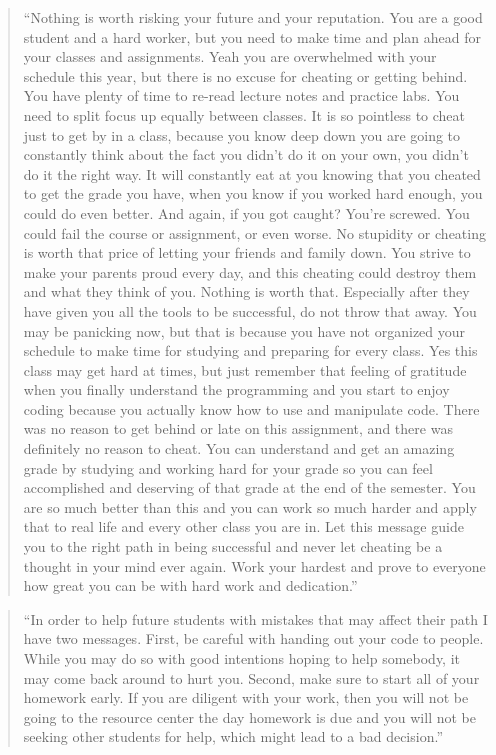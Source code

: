 \documentclass[12pt]{scrartcl}
\begin{document}
\begin{quote}
``Nothing is worth risking your future and your reputation. You are a good student and a hard worker, but you need to make time and plan ahead for your classes and assignments. Yeah you are overwhelmed with your schedule this year, but there is no excuse for cheating or getting behind. You have plenty of time to re-read lecture notes and practice labs. You need to split focus up equally between classes. It is so pointless to cheat just to get by in a class, because you know deep down you are going to constantly think about the fact you didn't do it on your own, you didn't do it the right way. It will constantly eat at you knowing that you cheated to get the grade you have, when you know if you worked hard enough, you could do even better. And again, if you got caught? You're screwed. You could fail the course or assignment, or even worse. No stupidity or cheating is worth that price of letting your friends and family down. You strive to make your parents proud every day, and this cheating could destroy them and what they think of you. Nothing is worth that. Especially after they have given you all the tools to be successful, do not throw that away. You may be panicking now, but that is because you have not organized your schedule to make time for studying and preparing for every class. Yes this class may get hard at times, but just remember that feeling of gratitude when you finally understand the programming and you start to enjoy coding because you actually know how to use and manipulate code. There was no reason to get behind or late on this assignment, and there was definitely no reason to cheat. You can understand and get an amazing grade by studying and working hard for your grade so you can feel accomplished and deserving of that grade at the end of the semester. You are so much better than this and you can work so much harder and apply that to real life and every other class you are in. Let this message guide you to the right path in being successful and never let cheating be a thought in your mind ever again. Work your hardest and prove to everyone how great you can be with hard work and dedication.''
\end{quote}

\begin{quote}
``In order to help future students with mistakes that may affect their path I have two messages. First, be careful with handing out your code to people. While you may do so with good intentions hoping to help somebody, it may come back around to hurt you. Second, make sure to start all of your homework early. If you are diligent with your work, then you will not be going to the resource center the day homework is due and you will not be seeking other students for help, which might lead to a bad decision.''
\end{quote}
\end{document}
